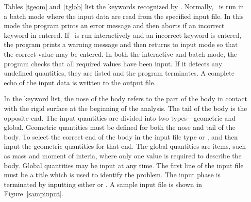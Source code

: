 Tables \ref{tgeom} and~\ref{tglob} list the keywords recognized by
\SLAP. Normally, \SLAP\  is run in a batch mode where the input data are
read from the specified input file.  In this mode the program prints an
error message and then aborts if an incorrect keyword in entered. If
\SLAP\ is run interactively and an incorrect keyword is entered, the
program prints a warning message and then returns to input mode so that
the correct value may be entered.  In both the interactive and batch
mode, the program checks that all required values have been input.  If
it detects any undefined quantities, they are listed and the program
terminates. A complete echo of the input data is written to the output
file. 

In the keyword list, the nose of the body refers to the part
of the body in contact with the rigid surface at the beginning of the
analysis. The tail of the body is the opposite end.  The input
quantities are divided into two types---geometric and global.
Geometric quantities must be defined for both the nose and tail of the
body. To select the correct end of the body in the input file type
 or , and then input the geometric quantities for
that end.  The global quantities are items, such as mass and moment of
interia, where only one value is required to describe the body.  Global
quantities may be input at any time.  The first line of the input file
must be a title which is used to identify the problem.  The input phase
is terminated by inputting either  or .  A sample
input file is shown in Figure~\ref{sampinput}. 
